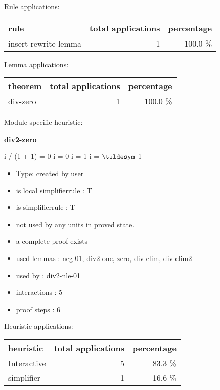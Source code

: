 \documentclass[a4paper]{article}
\begin{document}
Rule applications:

\begin{supertabular}{l|r|r}
rule	        & total applications & percentage \\ \hline
insert rewrite lemma & 1 & 100.0 \% \\

\end{supertabular}

Lemma applications:

\begin{supertabular}{l|r|r}
theorem	        & total applications & percentage \\ \hline
div-zero & 1 & 100.0 \% \\

\end{supertabular}

Module specific heuristic:

\pagebreak

{\LARGE\bf div2-zero}\label{lemma-div2-zero}

\medskip

 \Fol i / (1 + 1) = 0 \Equiv i = 0 \Or i = 1 \Or i = $\tildesym$ 1

\begin{itemize}

\item Type: created by user

\item is local simplifierrule : T
\item is simplifierrule : T
\item not used by any units in proved state.
\item       a complete proof exists
\item       used lemmas  : neg-01, div2-one, zero, div-elim, div-elim2
\item       used by      : div2-nle-01
\item       interactions : 5
\item       proof steps  : 6
\end{itemize}

\medskip


Heuristic applications:

\begin{supertabular}{l|r|r}
heuristic	& total applications & percentage \\ \hline
Interactive & 5 & 83.3 \% \\
simplifier & 1 & 16.6 \% \\

\end{supertabular}
\end{document}
